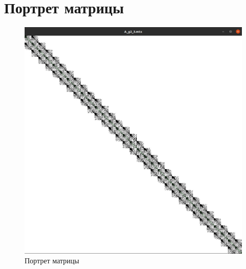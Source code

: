 	
	\section{Портрет матрицы}
	\begin{center}
\begin{figure}[h]
	\centering
	\includegraphics[scale=0.4]{YXQeLtRSUvc.jpg}
	\caption{Портрет матрицы}
	\label{fig:base-model-shema}
\end{figure}
\end{center}





